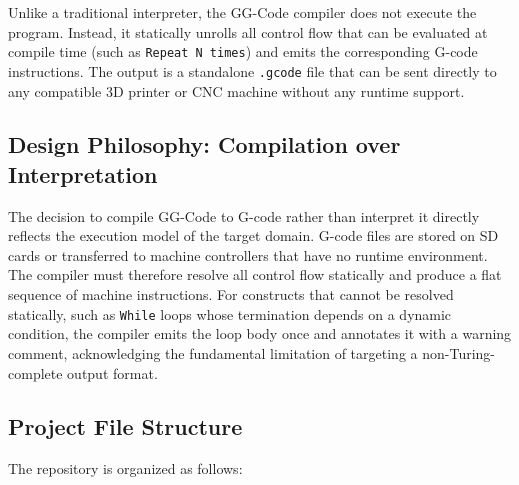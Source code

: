 Unlike a traditional interpreter, the GG-Code compiler does not execute the program. Instead, it statically unrolls all control flow that can be evaluated at compile time (such as \texttt{Repeat N times}) and emits the corresponding G-code instructions. The output is a standalone \texttt{.gcode} file that can be sent directly to any compatible 3D printer or CNC machine without any runtime support.

\subsection*{Design Philosophy: Compilation over Interpretation}

The decision to compile GG-Code to G-code rather than interpret it directly reflects the execution model of the target domain. G-code files are stored on SD cards or transferred to machine controllers that have no runtime environment. The compiler must therefore resolve all control flow statically and produce a flat sequence of machine instructions. For constructs that cannot be resolved statically, such as \texttt{While} loops whose termination depends on a dynamic condition, the compiler emits the loop body once and annotates it with a warning comment, acknowledging the fundamental limitation of targeting a non-Turing-complete output format.

\subsection*{Project File Structure}

The repository is organized as follows:

